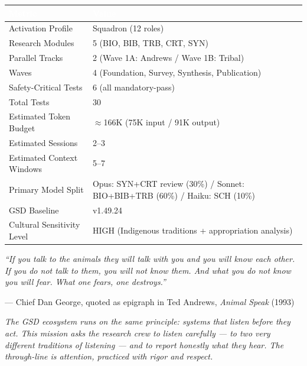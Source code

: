 \documentclass[11pt,letterpaper]{article}
\newcommand{\tableheader}[1]{\textbf{\sffamily\textcolor{white}{#1}}}
\begin{document}
\begin{center}
\begin{tabularx}{\textwidth}{L{4cm}X}
\toprule
{}
\tableheader{Metric} & \tableheader{Value} \\
\midrule
Activation Profile & Squadron (12 roles) \\
Research Modules & 5 (BIO, BIB, TRB, CRT, SYN) \\
Parallel Tracks & 2 (Wave 1A: Andrews / Wave 1B: Tribal) \\
Waves & 4 (Foundation, Survey, Synthesis, Publication) \\
Safety-Critical Tests & 6 (all mandatory-pass) \\
Total Tests & 30 \\
Estimated Token Budget & $\approx$166K (75K input / 91K output) \\
Estimated Sessions & 2--3 \\
Estimated Context Windows & 5--7 \\
Primary Model Split & Opus: SYN+CRT review (30\%) / Sonnet: BIO+BIB+TRB (60\%) / Haiku: SCH (10\%) \\
GSD Baseline & v1.49.24 \\
Cultural Sensitivity Level & HIGH (Indigenous traditions + appropriation analysis) \\
\bottomrule
\end{tabularx}
\end{center}

\vspace{2em}

\begin{quotebox}
\textit{``If you talk to the animals they will talk with you and you will know each other. If you do not talk to them, you will not know them. And what you do not know you will fear. What one fears, one destroys.''}

\vspace{0.5em}
--- Chief Dan George, quoted as epigraph in Ted Andrews, \emph{Animal Speak} (1993)

\vspace{1em}
\textit{The GSD ecosystem runs on the same principle: systems that listen before they act. This mission asks the research crew to listen carefully --- to two very different traditions of listening --- and to report honestly what they hear. The through-line is attention, practiced with rigor and respect.}
\end{quotebox}
\end{document}
